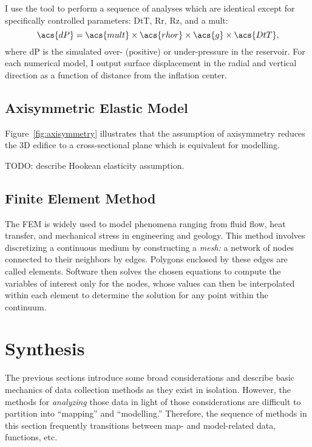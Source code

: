 I use the  tool to perform a sequence of analyses which are identical except for specifically controlled parameters: \ac{DtT}, \ac{Rr}, \ac{Rz}, and a \ac{mult}:
\begin{equation}
    \acs{dP}=\acs{mult}\times\acs{rhor}\times\acs{g}\times\acs{DtT},
\end{equation}
where \acs{dP} is the simulated over- (positive) or under-pressure in the reservoir. For each numerical model, I output surface displacement in the radial and vertical direction as a function of distance from the inflation center. 

\subsection{Axisymmetric Elastic Model}

Figure~\ref{fig:axisymmetry} illustrates that the assumption of axisymmetry reduces the 3D edifice to a cross-sectional plane which is equivalent for modelling.

TODO: describe Hookean elasticity assumption.

\subsection{Finite Element Method}

The \ac{FEM} is widely used to model phenomena ranging from fluid flow, heat transfer, and mechanical stress in engineering and geology. This method involves discretizing a continuous medium by constructing a \emph{mesh:} a network of nodes connected to their neighbors by edges. Polygons enclosed by these edges are called elements. Software then solves the chosen equations to compute the variables of interest only for the nodes, whose values can then be interpolated within each element to determine the solution for any point within the continuum.

\section{Synthesis}

The previous sections introduce some broad considerations and describe basic mechanics of data collection methods as they exist in isolation. However, the methods for \emph{analyzing} those data in light of those considerations are difficult to partition into ``mapping'' and ``modelling.'' Therefore, the sequence of methods in this section frequently transitions between map- and model-related data, functions, etc.

